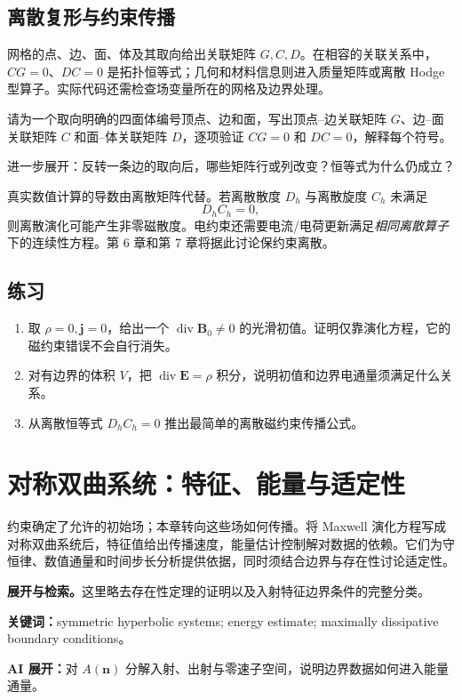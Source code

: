 \documentclass[UTF8,11pt,openany]{ctexbook}
\numberwithin{equation}{chapter}
\theoremstyle{definition}
\theoremstyle{remark}
\newcommand{\Div}{\operatorname{div}}
\newcommand{\studyroute}[3]{%
  \par\smallskip\noindent\textbf{展开与检索。}#1\par
  \noindent\textbf{关键词：}#2。\par
  \noindent\textbf{AI 展开：}#3\par
}
\begin{document}
\section{离散复形与约束传播}
\begin{engineernote}
网格的点、边、面、体及其取向给出关联矩阵 $G,C,D$。在相容的关联关系中，$CG=0$、$DC=0$ 是拓扑恒等式；几何和材料信息则进入质量矩阵或离散 Hodge 型算子。实际代码还需检查场变量所在的网格及边界处理。
\end{engineernote}

\begin{askai}
请为一个取向明确的四面体编号顶点、边和面，写出顶点--边关联矩阵 $G$、边--面关联矩阵 $C$ 和面--体关联矩阵 $D$，逐项验证 $CG=0$ 和 $DC=0$，解释每个符号。

进一步展开：反转一条边的取向后，哪些矩阵行或列改变？恒等式为什么仍成立？
\end{askai}
真实数值计算的导数由离散矩阵代替。若离散散度 $D_h$ 与离散旋度 $C_h$ 未满足
\begin{equation}\label{eq:discretecomplex}
D_hC_h=0,
\end{equation}
则离散演化可能产生非零磁散度。电约束还需要电流/电荷更新满足\emph{相同离散算子}下的连续性方程。第 6 章和第 7 章将据此讨论保约束离散。

\section{练习}
\begin{enumerate}
\item 取 $\rho=0,\bm j=0$，给出一个 $\Div\bm B_0\neq0$ 的光滑初值。证明仅靠演化方程，它的磁约束错误不会自行消失。
\item 对有边界的体积 $V$，把 $\Div\bm E=\rho$ 积分，说明初值和边界电通量须满足什么关系。
\item 从离散恒等式 $D_hC_h=0$ 推出最简单的离散磁约束传播公式。
\end{enumerate}

\chapter{对称双曲系统：特征、能量与适定性}
\label{ch:hyperbolic}
\begin{chaptersummary}
约束确定了允许的初始场；本章转向这些场如何传播。将 Maxwell 演化方程写成对称双曲系统后，特征值给出传播速度，能量估计控制解对数据的依赖。它们为守恒律、数值通量和时间步长分析提供依据，同时须结合边界与存在性讨论适定性。
\end{chaptersummary}
\studyroute{这里略去存在性定理的证明以及入射特征边界条件的完整分类。}{symmetric hyperbolic systems; energy estimate; maximally dissipative boundary conditions}{对 $A(\bm n)$ 分解入射、出射与零速子空间，说明边界数据如何进入能量通量。}
\end{document}
